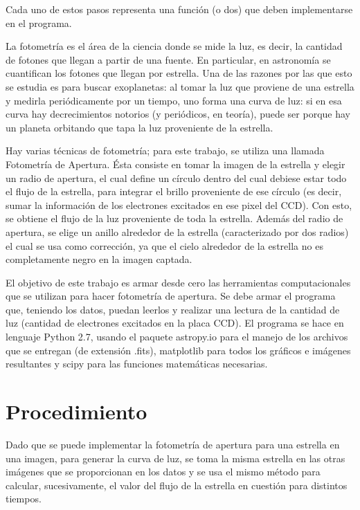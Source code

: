 \documentclass[a4paper, 11pt, spanish]{article}
\begin{document}
Cada uno de estos pasos representa una funci\'on (o dos) que deben implementarse en el programa.

La fotometr\'ia es el \'area de la ciencia donde se mide la luz, es decir, la cantidad de fotones que llegan a partir de una fuente. En particular, en astronom\'ia se cuantifican los fotones que llegan por estrella. Una de las razones por las que esto se estudia es para buscar exoplanetas: al tomar la luz que proviene de una estrella y medirla peri\'odicamente por un tiempo, uno forma una curva de luz: si en esa curva hay decrecimientos notorios (y peri\'odicos, en teor\'ia), puede ser porque hay un planeta orbitando que tapa la luz proveniente de la estrella. 

Hay varias t\'ecnicas de fotometr\'ia; para este trabajo, se utiliza una llamada Fotometr\'ia de Apertura. \'Esta consiste en tomar la imagen de la estrella y elegir un radio de apertura, el cual define un c\'irculo dentro del cual debiese estar todo el flujo de la estrella, para integrar el brillo proveniente de ese c\'irculo (es decir, sumar la informaci\'on de los electrones excitados en ese pixel del CCD). Con esto, se obtiene el flujo de la luz proveniente de toda la estrella. Adem\'as del radio de apertura, se elige un anillo alrededor de la estrella (caracterizado por dos radios) el cual se usa como correcci\'on, ya que el cielo alrededor de la estrella no es completamente negro en la imagen captada.


El objetivo de este trabajo es armar desde cero las herramientas computacionales que se utilizan para hacer fotometr\'ia de apertura. Se debe armar el programa que, teniendo los datos, puedan leerlos y realizar una lectura de la cantidad de luz (cantidad de electrones excitados en la placa CCD). El programa se hace en lenguaje Python 2.7, usando el paquete astropy.io para el manejo de los archivos que se entregan (de extensi\'on .fits), matplotlib para todos los gr\'aficos e im\'agenes resultantes y scipy para las funciones matem\'aticas necesarias.


\section{Procedimiento}
Dado que se puede implementar la fotometr\'ia de apertura para una estrella en una imagen, para generar la curva de luz, se toma la misma estrella en las otras im\'agenes que se proporcionan en los datos y se usa el mismo m\'etodo para calcular, sucesivamente, el valor del flujo de la estrella en cuesti\'on para distintos tiempos.  
\end{document}
